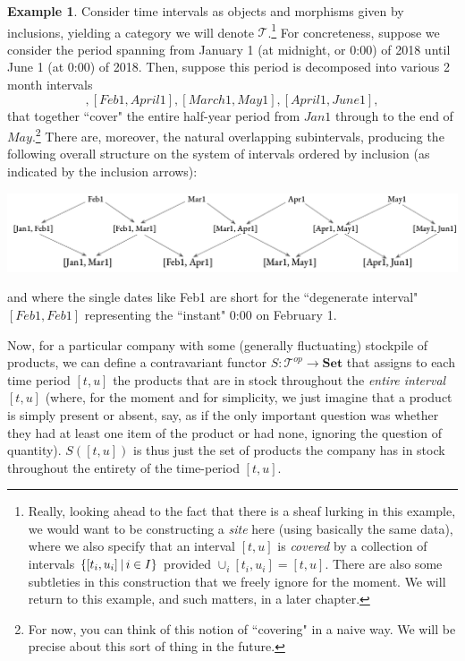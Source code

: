 \documentclass[a4paper]{book}
\theoremstyle{definition}
\newtheorem{example}{Example}[section]
\theoremstyle{definition}
\theoremstyle{definition}
\theoremstyle{theorem}
\theoremstyle{definition}
\begin{document}
\begin{example}
	Consider time intervals as objects and morphisms given by inclusions, yielding a category we will denote $\mathcal{T}$.\footnote{Really, looking ahead to the fact that there is a sheaf lurking in this example, we would want to be constructing a \textit{site} here (using basically the same data), where we also specify that an interval $[t,u]$ is \textit{covered} by a collection of intervals $\{[t_i, u_i] \hspace*{0.2em}|\hspace*{0.2em} i \in I \}$ provided $\cup_i [t_i, u_i] = [t,u]$. There are also some subtleties in this construction that we freely ignore for the moment. We will return to this example, and such matters, in a later chapter.} For concreteness, suppose we consider the period spanning from January 1 (at midnight, or 0:00) of 2018 until June 1 (at 0:00) of 2018. Then, suppose this period is decomposed into various 2 month intervals 
	\begin{equation*} 
	[Jan1, March1], [Feb1, April1], [March1, May1], [April1, June1], 
	\end{equation*}
	that together ``cover" the entire half-year period from $Jan1$ through to the end of $May$.\footnote{For now, you can think of this notion of ``covering" in a naive way. We will be precise about this sort of thing in the future.} There are, moreover, the natural overlapping subintervals, producing the following overall structure on the system of intervals ordered by inclusion (as indicated by the inclusion arrows):  
	\begin{center}
		\includegraphics*[scale= 0.3]{TimeIntervalSite.png}
	\end{center}
and where the single dates like Feb1 are short for the ``degenerate interval" $[Feb1, Feb1]$ representing the ``instant" 0:00 on February 1. \par 
Now, for a particular company with some (generally fluctuating) stockpile of products, we can define a contravariant functor $S: \mathcal{T}^{op} \rightarrow \textbf{Set}$ that assigns to each time period $[t,u]$ the products that are in stock throughout the \textit{entire interval} $[t,u]$ (where, for the moment and for simplicity, we just imagine that a product is simply present or absent, say, as if the only important question was whether they had at least one item of the product or had none, ignoring the question of quantity). $S([t,u])$ is thus just the set of products the company has in stock throughout the entirety of the time-period $[t,u]$. \par 

\end{example}
\end{document}
